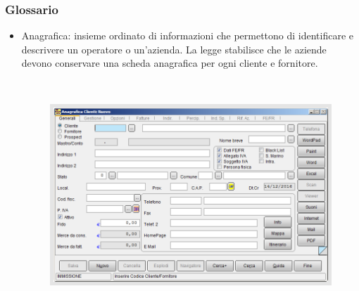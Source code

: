 \documentclass[]{beamer}
\begin{document}
\begin{frame}
\frametitle{Glossario}
\begin{itemize}
  \item \alert{Anagrafica:} insieme ordinato di informazioni che permettono di identificare e descrivere un operatore o un'azienda. La legge stabilisce che le aziende devono conservare una scheda anagrafica per ogni cliente e fornitore.
  
  ~
  
  \begin{figure}
    \includegraphics[width=.6\columnwidth]{img/anagrafica.png}
  \end{figure}
\end{itemize}
\end{frame}
\end{document}
